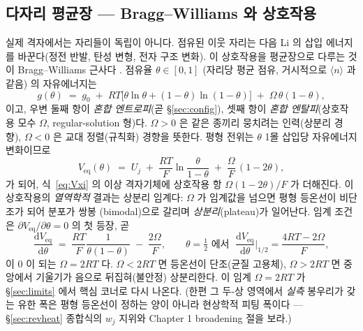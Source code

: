\documentclass[11pt,a4paper]{article}
\newcommand{\dd}{\mathrm{d}}
\newcommand{\eq}{\mathrm{eq}}
\newcommand{\avg}[1]{\langle #1\rangle}
\begin{document}
\subsection{다자리 평균장 — Bragg--Williams 와 상호작용}\label{ssec:BW}
실제 격자에서는 자리들이 독립이 아니다. 점유된 이웃 자리는 다음 Li 의 삽입 에너지를 바꾼다(정전 반발,
탄성 변형, 전자 구조 변화). 이 상호작용을 평균장으로 다루는 것이 Bragg--Williams 근사다 \cite{huggins2009,
bazant2013}. 점유율 $\theta\in[0,1]$ (자리당 평균 점유, 거시적으로 $\avg{n}$ 과 같음) 의 자유에너지는
\begin{equation}
g(\theta) \;=\; g_0 \;+\; RT\bigl[\theta\ln\theta + (1-\theta)\ln(1-\theta)\bigr]
\;+\; \Omega\,\theta(1-\theta),
\label{eq:BW}
\end{equation}
이고, 우변 둘째 항이 \emph{혼합 엔트로피}(곧 \S\ref{sec:config}), 셋째 항이 \emph{혼합 엔탈피}(상호작용
모수 $\Omega$, regular-solution 형)다. $\Omega>0$ 은 같은 종끼리 뭉치려는 인력(상분리 경향), $\Omega<0$ 은
교대 정렬(규칙화) 경향을 뜻한다. 평형 전위는 $\theta$ 1몰 삽입당 자유에너지 변화이므로
\begin{equation}
V_\eq(\theta) \;=\; U_j \;+\; \frac{RT}{F}\ln\!\frac{\theta}{1-\theta} \;+\; \frac{\Omega}{F}\,(1-2\theta),
\label{eq:Veq_BW}
\end{equation}
가 되어, 식~\eqref{eq:Vxi} 의 이상 격자기체에 상호작용 항 $\Omega(1-2\theta)/F$ 가 더해진다. 이 상호작용의
\emph{열역학적} 결과는 상분리 임계다: $\Omega$ 가 임계값을 넘으면 평형 등온선이 비단조가 되어 분포가 쌍봉
(bimodal)으로 갈리며 \emph{상분리}(plateau)가 일어난다. 임계 조건은 $\partial V_\eq/\partial\theta=0$ 의 첫 등장, 곧
\begin{equation}
\frac{\dd V_\eq}{\dd\theta} \;=\; \frac{RT}{F}\frac{1}{\theta(1-\theta)} \;-\; \frac{2\Omega}{F},
\qquad
\theta=\tfrac12\text{ 에서 }\;\frac{\dd V_\eq}{\dd\theta}\Big|_{1/2}=\frac{4RT-2\Omega}{F},
\label{eq:slope_BW}
\end{equation}
이 0 이 되는 $\Omega=2RT$ 다. $\Omega<2RT$ 면 등온선이 단조(균질 고용체), $\Omega>2RT$ 면 중앙에서
기울기가 음으로 뒤집혀(불안정) 상분리한다. 이 임계 $\Omega=2RT$ 가 \S\ref{sec:limits} 에서 핵심 코너로 다시
나온다. (한편 그 두-상 영역에서 \emph{실측} 봉우리가 갖는 유한 폭은 평형 등온선이 정하는 양이 아니라 현상학적
피팅 폭이다 — \S\ref{sec:revheat} 종합식의 $w_j$ 지위와 Chapter 1 broadening 절을 보라.)

\end{document}
